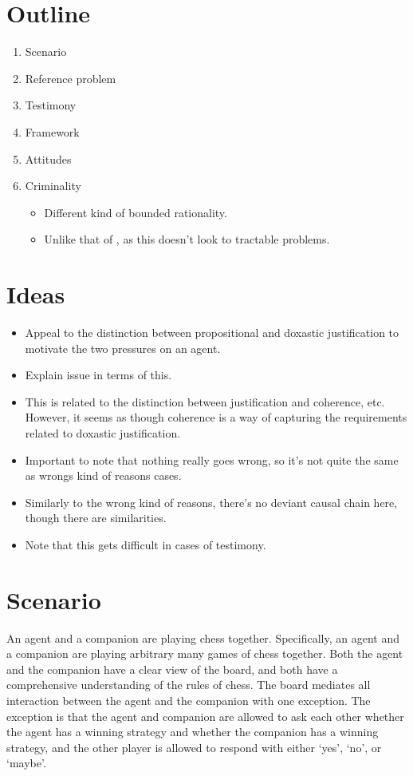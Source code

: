 \documentclass[10pt]{article}
\begin{document}
\section{Outline}
\label{sec:outline}

\begin{enumerate}
\item Scenario
\item Reference problem
\item Testimony
\item Framework
\item Attitudes
\item Criminality
  \begin{itemize}
  \item Different kind of bounded rationality.
  \item Unlike that of \citeauthor{Simon:1957aa}, as this doesn't look to tractable problems.
  \end{itemize}
\end{enumerate}

\section{Ideas}
\label{sec:ideas}

\begin{itemize}
\item Appeal to the distinction between propositional and doxastic justification to motivate the two pressures on an agent.
\item Explain issue in terms of this.
\item This is related to the distinction between justification and coherence, etc.
  However, it seems as though coherence is a way of capturing the requirements related to doxastic justification.
\item Important to note that nothing really goes wrong, so it's not quite the same as wrongs kind of reasons cases.
\item Similarly to the wrong kind of reasons, there's no deviant causal chain here, though there are similarities.
\item Note that this gets difficult in cases of testimony.
\end{itemize}


\section{Scenario}
\label{sec:scenario}

An agent and a companion are playing chess together.
Specifically, an agent and a companion are playing arbitrary many games of chess together.
Both the agent and the companion have a clear view of the board, and both have a comprehensive understanding of the rules of chess.
The board mediates all interaction between the agent and the companion with one exception.
The exception is that the agent and companion are allowed to ask each other whether the agent has a winning strategy and whether the companion has a winning strategy, and the other player is allowed to respond with either `yes', `no', or `maybe'.
\end{document}
